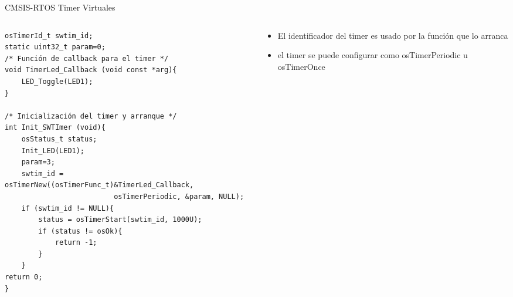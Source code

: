 \begin{frame}[fragile]{CMSIS-RTOS Timer Virtuales}
    \begin{columns}
        \begin{column}{0.65\textwidth}
            \begin{verbatim}
osTimerId_t swtim_id;
static uint32_t param=0;
/* Función de callback para el timer */
void TimerLed_Callback (void const *arg){
    LED_Toggle(LED1);
}

/* Inicialización del timer y arranque */
int Init_SWTImer (void){
    osStatus_t status;
    Init_LED(LED1);
    param=3;
    swtim_id = osTimerNew((osTimerFunc_t)&TimerLed_Callback, 
                          osTimerPeriodic, &param, NULL);
    if (swtim_id != NULL){
        status = osTimerStart(swtim_id, 1000U);
        if (status != osOk){
            return -1;
        }
    }
return 0;
}

        \end{verbatim}
     \end{column}
     \begin{column}{0.35\textwidth}
         \begin{itemize}
             \item El identificador del timer es usado por la función que lo arranca
             \item el timer se puede configurar como osTimerPeriodic u osTimerOnce
         \end{itemize}
     \end{column}
    \end{columns}
\end{frame}


